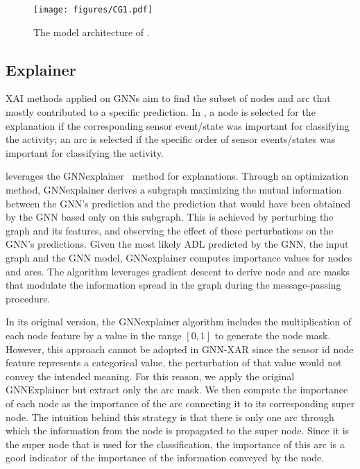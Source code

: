    \begin{figure}[h!]
        \centering
        \texttt{[image: figures/CG1.pdf]}
        \caption{The model architecture of \acronym{}.}
        \label{fig:GNN}
    \end{figure}

\subsection{Explainer}

XAI methods applied on GNNs aim to find the subset of nodes and arc that mostly contributed to a specific prediction. In \acronym{}, a node is selected for the explanation if the corresponding sensor event/state was important for classifying the activity; an arc is selected if the specific order of sensor events/states was important for classifying the activity.

\acronym{} leverages the GNNexplainer~\cite{ying2019gnnexplainer} method for explanations. Through an optimization method, GNNexplainer derives a subgraph maximizing the mutual information between the GNN's prediction and the prediction that would have been obtained by the GNN based only on this subgraph. This is achieved by perturbing the graph and its features, and observing the effect of these perturbations on the GNN's predictions. Given the most likely ADL predicted by the GNN, the input graph and the GNN model, GNNexplainer computes importance values for nodes and arcs. The algorithm leverages gradient descent to derive node and arc masks that modulate the information spread in the graph during the message-passing procedure. 


In its original version, the GNNexplainer algorithm includes the multiplication of each node feature by a value in the range $[0,1]$ to generate the node mask.
However, this approach cannot be adopted in GNN-XAR since the sensor id node feature represents a categorical value, %
the perturbation of that value would not convey the intended meaning. For this reason, we apply the original GNNExplainer but extract only the arc mask. We then compute the importance of each node as the importance of the arc connecting it to its corresponding super node. 
The intuition behind this strategy is that there is only one arc through which the information from the node is propagated to the super node. Since it is the super node that is used for the classification, the importance of this arc is a good indicator of the importance of the information conveyed by the node.

